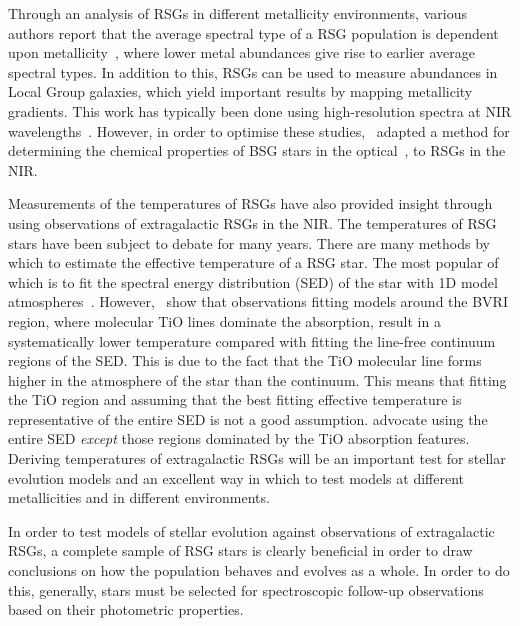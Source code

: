 Through an analysis of RSGs in different metallicity environments, various authors report that the average spectral type of a RSG population is dependent upon metallicity~\citep{Elias85, MasseyOlsen03, 2012AJ....144....2L}, where lower metal abundances give rise to earlier average spectral types.
In addition to this, RSGs can be used to measure abundances in Local Group galaxies, which yield important results by mapping metallicity gradients.
This work has typically been done using high-resolution spectra at NIR wavelengths~\citep{Cunha07, Davies09a,Davies09b}.
However, in order to optimise these studies,~\cite{2010MNRAS.407.1203D} adapted a method for determining the chemical properties of BSG stars in the optical~\citep{Kudritzki08,Kudritzki10}, to RSGs in the NIR.

Measurements of the temperatures of RSGs have also provided insight through using observations of extragalactic RSGs in the NIR.
The temperatures of RSG stars have been subject to debate for many years.
There are many methods by which to estimate the effective temperature of a RSG star.
The most popular of which is to fit the spectral energy distribution (SED) of the star with 1D model atmospheres~\citep{2008A&A...486..951G}.
However,~\cite{2013ApJ...767....3D} show that observations fitting models around the BVRI region, where molecular TiO lines dominate the absorption, result in a systematically lower temperature compared with fitting the line-free continuum regions of the SED.
This is due to the fact that the TiO molecular line forms higher in the atmosphere of the star than the continuum.
This means that fitting the TiO region and assuming that the best fitting effective temperature is representative of the entire SED is not a good assumption.
\cite{2013ApJ...767....3D} advocate using the entire SED \textit{except} those regions dominated by the TiO absorption features.
Deriving temperatures of extragalactic RSGs will be an important test for stellar evolution models and an excellent way in which to test models at different metallicities and in different environments.

In order to test models of stellar evolution against observations of extragalactic RSGs, a complete sample of RSG stars is clearly beneficial in order to draw conclusions on how the population behaves and evolves as a whole.
In order to do this, generally, stars must be selected for spectroscopic follow-up observations based on their photometric properties.

